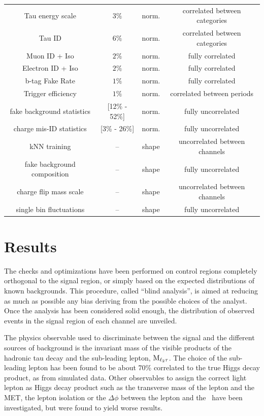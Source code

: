 \begin{table}
\begin{center}
\begin{tabular}{c c c c}
      Tau energy scale        & $3\%$   & norm. & correlated between categories\\
      Tau ID                  & $6\%$ & norm. & correlated between categories\\
      Muon ID + Iso           & $2\%$ & norm. & fully correlated \\
      Electron ID + Iso       & $2\%$ & norm. & fully correlated  \\
      b-tag Fake Rate         & $1\%$ & norm. & fully correlated  \\
      Trigger efficiency  & $1\%$ & norm. & correlated between periods  \\
      fake background statistics & [12\% - 52\%] & norm. & fully uncorrelated \\
      charge mis-ID statistics & [3\% - 26\%] & norm. & fully uncorrelated \\
      kNN training & -- & shape & uncorrelated between channels \\
      fake background composition & -- & shape & fully uncorrelated \\
      charge flip mass scale & -- & shape & uncorrelated between channels \\
      single bin fluctuations & -- & shape & fully uncorrelated \\
      \hline
    \end{tabular}
  \end{center}
\end{table}

\section{Results}

The checks and optimizations have been performed on control regions completely orthogonal to the signal region, or simply based on the expected distributions of known backgrounds. This procedure, called ``blind analysis'', is aimed at reducing as much as possible any bias deriving from the possible choices of the analyst. 
Once the analysis has been considered solid enough, the distribution of observed events in the signal region of each channel are unveiled. 

The physics observable used to discriminate between the signal and the different sources of background is the invariant mass of the visible products of the hadronic tau decay and the sub-leading lepton, $\rm{M}_{\ell_2 \tau}$. The choice of the sub-leading lepton has been found to be about 70\% correlated to the true Higgs decay product, as from simulated data. Other observables to assign the correct light lepton as Higgs decay product such as the transverse mass of the lepton and the MET, the lepton isolation or the $\Delta\phi$ between the lepton and the \MET\ have been investigated, but were found to yield worse results.

